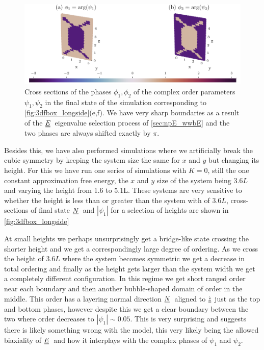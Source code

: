 \documentclass[12pt]{article}
\newcommand{\suf}[2]{\stackunder[0.5pt]{\stackunder[1pt]{\ensuremath{#1}}{\rule{\widthof{\ensuremath{#2}}*\real{0.9}}{.1ex}}}{}}
\newcommand{\duf}[2]{\stackunder[0.5pt]{\stackunder[0.8pt]{\stackunder[1pt]{\ensuremath{#1}}{\rule{\widthof{\ensuremath{#2}}*\real{0.9}}{.1ex}}}{\rule{\widthof{\ensuremath{#2}}*\real{0.9}}{.1ex}}}{}}
\newcommand{\su}[1]{\suf{#1}{#1}}
\newcommand{\du}[1]{\duf{#1}{#1}}
\newcommand{\NN}{\ensuremath{\su{N}}}
\newcommand{\EE}{\ensuremath{\du{E}}}
\begin{document}
        \begin{figure}[t!]
            \begin{center}
                \includegraphics{figures/data_plots/3dfbox_r17_sidephi.pdf}
            \end{center}
            \caption{
                Cross sections of the phases $\phi_1, \phi_2$ of the complex order parameters $\psi_1, \psi_2$ in the final state of the simulation corresponding to \cref{fig:3dfbox_longside}(e,f).
                We have very sharp boundaries as a result of the \EE\ eigenvalue selection process of \cref{sec:npE_wwbE} and the two phases are always shifted exactly by $\pi$.
            }\label{fig:3dfbox_longsidephi}
        \end{figure}

        Besides this, we have also performed simulations where we artificially break the cubic symmetry by keeping the system size the same for $x$ and $y$ but changing its height.
        For this we have run one series of simulations with $K=0$, still the one constant approximation free energy, the $x$ and $y$ size of the system being $3.6\si{L}$ and varying the height from 1.6 to 5.1\si{L}.
        These systems are very sensitive to whether the height is less than or greater than the system with of $3.6\si{L}$, cross-sections of final state \NN\ and $|\psi_1|$ for a selection of heights are shown in \cref{fig:3dfbox_longside}

        At small heights we perhaps unsurprisingly get a bridge-like state crossing the shorter height and we get a correspondingly large degree of ordering.
        As we cross the height of $3.6\si{L}$ where the system becomes symmetric we get a decrease in total ordering and finally as the height gets larger than the system width we get a completely different configuration.
        In this regime we get short ranged order near each boundary and then another bubble-shaped domain of order in the middle.
        This order has a layering normal direction \NN\ aligned to $\hat{\du{z}}$ just as the top and bottom phases, however despite this we get a clear boundary between the two where order decreases to $|\psi_1|\sim0.05$.
        This is very surprising and suggests there is likely something wrong with the model, this very likely being the allowed biaxiality of \EE\ and how it interplays with the complex phases of $\psi_1$ and $\psi_2$.
\end{document}
